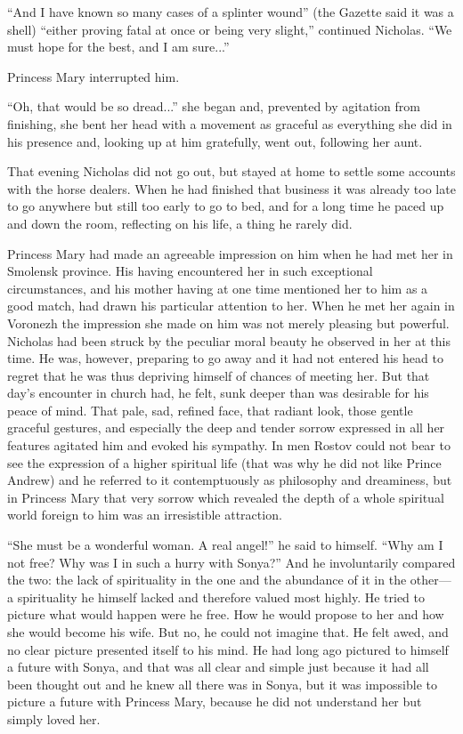 ``And I have known so many cases of a splinter wound'' (the
Gazette said it was a shell) ``either proving fatal at once or
being very slight,'' continued Nicholas. ``We must hope for the
best, and I am sure...''

Princess Mary interrupted him.

``Oh, that would be so dread...'' she began and, prevented by
agitation from finishing, she bent her head with a movement as
graceful as everything she did in his presence and, looking up at
him gratefully, went out, following her aunt.

That evening Nicholas did not go out, but stayed at home to
settle some accounts with the horse dealers. When he had finished
that business it was already too late to go anywhere but still
too early to go to bed, and for a long time he paced up and down
the room, reflecting on his life, a thing he rarely did.

Princess Mary had made an agreeable impression on him when he had
met her in Smolensk province. His having encountered her in such
exceptional circumstances, and his mother having at one time
mentioned her to him as a good match, had drawn his particular
attention to her. When he met her again in Voronezh the
impression she made on him was not merely pleasing but
powerful. Nicholas had been struck by the peculiar moral beauty
he observed in her at this time. He was, however, preparing to go
away and it had not entered his head to regret that he was thus
depriving himself of chances of meeting her. But that day's
encounter in church had, he felt, sunk deeper than was desirable
for his peace of mind. That pale, sad, refined face, that radiant
look, those gentle graceful gestures, and especially the deep and
tender sorrow expressed in all her features agitated him and
evoked his sympathy. In men Rostov could not bear to see the
expression of a higher spiritual life (that was why he did not
like Prince Andrew) and he referred to it contemptuously as
philosophy and dreaminess, but in Princess Mary that very sorrow
which revealed the depth of a whole spiritual world foreign to
him was an irresistible attraction.

``She must be a wonderful woman. A real angel!'' he said to
himself. ``Why am I not free? Why was I in such a hurry with
Sonya?'' And he involuntarily compared the two: the lack of
spirituality in the one and the abundance of it in the other---a
spirituality he himself lacked and therefore valued most
highly. He tried to picture what would happen were he free. How
he would propose to her and how she would become his wife.  But
no, he could not imagine that. He felt awed, and no clear picture
presented itself to his mind. He had long ago pictured to himself
a future with Sonya, and that was all clear and simple just
because it had all been thought out and he knew all there was in
Sonya, but it was impossible to picture a future with Princess
Mary, because he did not understand her but simply loved her.

